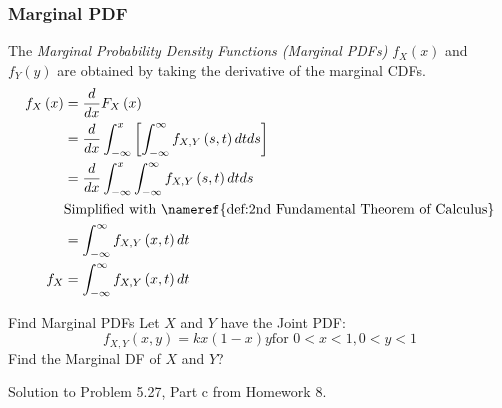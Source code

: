 		\subsubsection{Marginal PDF} \label{subsubsec:Marginal PDF}
			\begin{definition} \label{def:Marginal PDF}
				The \emph{Marginal Probability Density Functions (Marginal PDFs)} $f_{X} \left( x \right)$ and $f_{Y} \left( y \right)$ are obtained by taking the derivative of the marginal CDFs.
				\begin{equation}
					\begin{aligned}
						f_{X} \left( x \right) &= \frac{d}{dx} F_{X} \left( x \right) \\
						&= \frac{d}{dx} \int_{-\infty}^{x} \left[ \int_{-\infty}^{\infty} f_{X,Y} \left( s,t \right) dt ds \right] \\
						&= \frac{d}{dx} \int_{-\infty}^{x} \int_{-\infty}^{\infty} f_{X,Y} \left( s,t \right) dt ds \\
						&\text{Simplified with \nameref{def:2nd Fundamental Theorem of Calculus}} \\
						&= \int_{-\infty}^{\infty} f_{X,Y} \left( x,t \right) dt \\
						f_{X} &= \int_{-\infty}^{\infty} f_{X,Y} \left( x,t \right) dt \\
					\end{aligned}
				\end{equation}
			\end{definition}
			\begin{example}[Problem 5.27]{Find Marginal PDFs}
                          Let $X$ and $Y$ have the Joint PDF:
                          \begin{equation*}
                            f_{X,Y} \left( x,y \right) = k x \left( 1-x \right) y \text{for } 0<x<1, 0<y<1
                          \end{equation*}
                          Find the Marginal DF of $X$ and $Y$?

                          \tcblower

                          Solution to Problem 5.27, Part c from Homework 8.
			\end{example}

